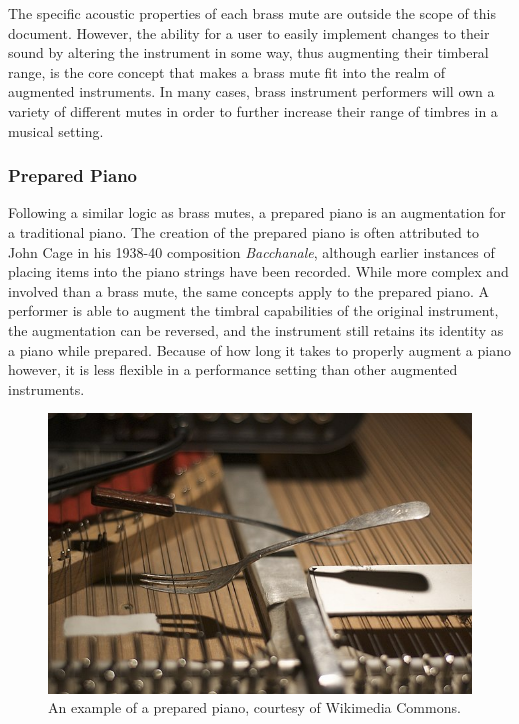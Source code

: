 The specific acoustic properties of each brass mute are outside the scope of this document. However, the ability for a user to easily implement changes to their sound by altering the instrument in some way, thus augmenting their timberal range, is the core concept that makes a brass mute fit into the realm of augmented instruments. In many cases, brass instrument performers will own a variety of different mutes in order to further increase their range of timbres in a musical setting.

\subsubsection{Prepared Piano}

Following a similar logic as brass mutes, a prepared piano is an augmentation for a traditional piano. The creation of the prepared piano is often attributed to John Cage in his 1938-40 composition \textit{Bacchanale}, although earlier instances of placing items into the piano strings have been recorded\cite{ppHist}. While more complex and involved than a brass mute, the same concepts apply to the prepared piano. A performer is able to augment the timbral capabilities of the original instrument, the augmentation can be reversed, and the instrument still retains its identity as a piano while prepared. Because of how long it takes to properly augment a piano however, it is less flexible in a performance setting than other augmented instruments\cite{ppArticle}. 

\begin{figure}
    \centering
    \includegraphics[scale=0.5]{diagrams/Prepared_piano_board_Neumann.jpg}
    \caption{An example of a prepared piano, courtesy of Wikimedia Commons.} %
    \label{fig:pp}
\end{figure}

